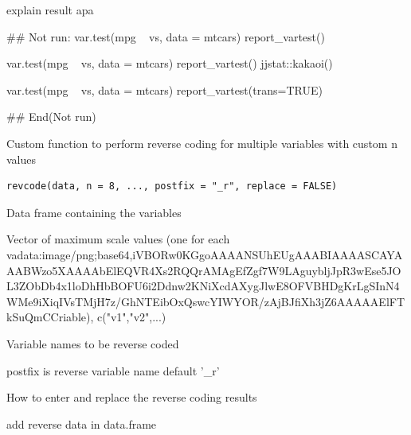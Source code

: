 \documentclass[a4paper]{book}
\begin{document}
%
\begin{Value}
explain result apa
\end{Value}
%
\begin{Examples}
\begin{ExampleCode}
## Not run: 
var.test(mpg ~ vs, data = mtcars)%
     report_vartest()

var.test(mpg ~ vs, data = mtcars)%
     report_vartest() %
     jjstat::kakaoi()

var.test(mpg ~ vs, data = mtcars)%
report_vartest(trans=TRUE)


## End(Not run)
\end{ExampleCode}
\end{Examples}
%
\begin{Description}
Custom function to perform reverse coding for multiple variables with custom n values
\end{Description}
%
\begin{Usage}
\begin{verbatim}
revcode(data, n = 8, ..., postfix = "_r", replace = FALSE)
\end{verbatim}
\end{Usage}
%
\begin{Arguments}
\begin{ldescription}
\item[\code{data}] Data frame containing the variables

\item[\code{n}] Vector of maximum scale values (one for each vadata:image/png;base64,iVBORw0KGgoAAAANSUhEUgAAABIAAAASCAYAAABWzo5XAAAAbElEQVR4Xs2RQQrAMAgEfZgf7W9LAguybljJpR3wEse5JOL3ZObDb4x1loDhHbBOFU6i2Ddnw2KNiXcdAXygJlwE8OFVBHDgKrLgSInN4WMe9iXiqIVsTMjH7z/GhNTEibOxQswcYIWYOR/zAjBJfiXh3jZ6AAAAAElFTkSuQmCCriable), c("v1","v2",...)

\item[\code{...}] Variable names to be reverse coded

\item[\code{postfix}] postfix is reverse variable name default '\_r'

\item[\code{replace}] How to enter and replace the reverse coding results
\end{ldescription}
\end{Arguments}
%
\begin{Value}
add reverse data in data.frame
\end{Value}
\end{document}
